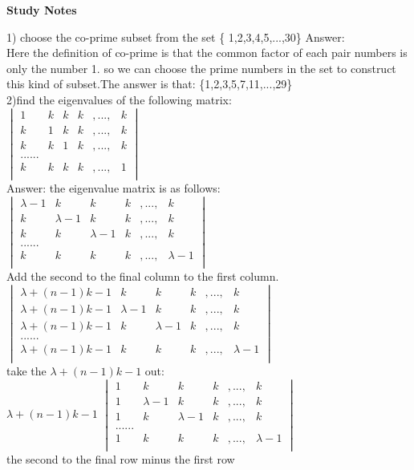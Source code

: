 \documentclass[12pt]{article}
\theoremstyle{plain}
\begin{document}
\begin{center}
\huge\bf{Study Notes}
\end{center}
1) choose the co-prime subset from the set \{ 1,2,3,4,5,...,30\}
\vfill
Answer:\\

Here the definition of co-prime is that the common factor of each pair numbers is only the number 1.
so we can choose the prime numbers in the set to construct this kind of subset.The answer is that:
\{1,2,3,5,7,11,...,29\}\\
\vfill
2)find the eigenvalues of the following matrix:\\
$\begin{vmatrix}
 1 &k&k&k&,...,&k \\
 k &1&k&k&,...,&k\\
 k &k&1&k&,...,&k\\
 ......\\
 k &k&k&k&,...,&1\\
\end{vmatrix}$
\\
\vfill
Answer: the eigenvalue matrix is as follows:\\
$\begin{vmatrix}
 \lambda-1 &k&k&k&,...,&k \\
 k &\lambda-1&k&k&,...,&k\\
 k &k&\lambda-1&k&,...,&k\\
 ......\\
 k &k&k&k&,...,&\lambda-1\\
\end{vmatrix}$
\\
\vfill
Add the second to the final column to the first column. \\
$\begin{vmatrix}
 \lambda+(n-1)k-1 &k&k&k&,...,&k \\
 \lambda+(n-1)k-1 &\lambda-1&k&k&,...,&k\\
 \lambda+(n-1)k-1 &k&\lambda-1&k&,...,&k\\
 ......\\
 \lambda+(n-1)k-1 &k&k&k&,...,&\lambda-1\\
\end{vmatrix}$
\\
take the $\lambda+(n-1)k-1$ out:\\
$\lambda+(n-1)k-1$
$\begin{vmatrix}
 1 &k&k&k&,...,&k \\
 1 &\lambda-1&k&k&,...,&k\\
 1 &k&\lambda-1&k&,...,&k\\
 ......\\
 1 &k&k&k&,...,&\lambda-1\\
\end{vmatrix}$
\\
the second to the final row minus the first row
\end{document}
